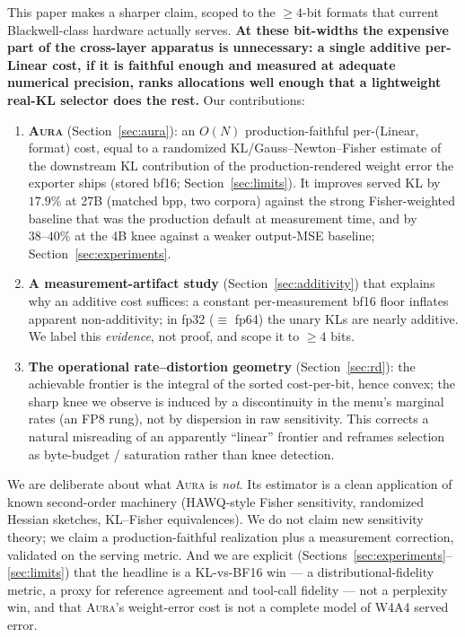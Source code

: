\documentclass[11pt]{article}
\theoremstyle{plain}
\theoremstyle{definition}
\begin{document}
This paper makes a sharper claim, scoped to the $\ge 4$-bit formats that current
Blackwell-class hardware actually serves. \textbf{At these bit-widths the
expensive part of the cross-layer apparatus is unnecessary: a single additive
per-Linear cost, if it is faithful enough and measured at adequate numerical
precision, ranks allocations well enough that a lightweight real-KL selector
does the rest.} Our contributions:

\begin{enumerate}[leftmargin=*,itemsep=2pt]
  \item \textbf{\textsc{Aura}} (Section~\ref{sec:aura}): an $O(N)$
    production-faithful per-(Linear, format) cost, equal to a randomized
    KL/Gauss--Newton--Fisher estimate of the downstream KL contribution of the
    production-rendered weight error the exporter ships (stored bf16;
    Section~\ref{sec:limits}). It improves served KL by $17.9\%$ at 27B (matched
    bpp, two corpora) against the strong Fisher-weighted baseline that was the
    production default at measurement time, and by $38\text{--}40\%$ at the 4B
    knee against a weaker output-MSE baseline; Section~\ref{sec:experiments}.
  \item \textbf{A measurement-artifact study} (Section~\ref{sec:additivity})
    that explains why an additive cost suffices: a constant per-measurement
    bf16 floor inflates apparent non-additivity; in fp32 ($\equiv$ fp64) the
    unary KLs are nearly additive. We label this \emph{evidence}, not proof, and
    scope it to $\ge 4$ bits.
  \item \textbf{The operational rate--distortion geometry}
    (Section~\ref{sec:rd}): the achievable frontier is the integral of the
    sorted cost-per-bit, hence convex; the sharp knee we observe is induced by a
    discontinuity in the menu's marginal rates (an FP8 rung), not by dispersion in
    raw sensitivity.
    This corrects a natural misreading of an apparently ``linear'' frontier and
    reframes selection as byte-budget / saturation rather than knee detection.
\end{enumerate}

We are deliberate about what \textsc{Aura} is \emph{not}. Its estimator is a
clean application of known second-order machinery (HAWQ-style Fisher sensitivity,
randomized Hessian sketches, KL--Fisher equivalences). We do not claim new
sensitivity theory; we claim a production-faithful realization plus a
measurement correction, validated on the serving metric. And we are explicit
(Sections~\ref{sec:experiments}--\ref{sec:limits}) that the headline is a
KL-vs-BF16 win --- a distributional-fidelity metric, a proxy for reference
agreement and tool-call fidelity --- not a perplexity win, and that \textsc{Aura}'s weight-error cost
is not a complete model of W4A4 served error.
\end{document}
